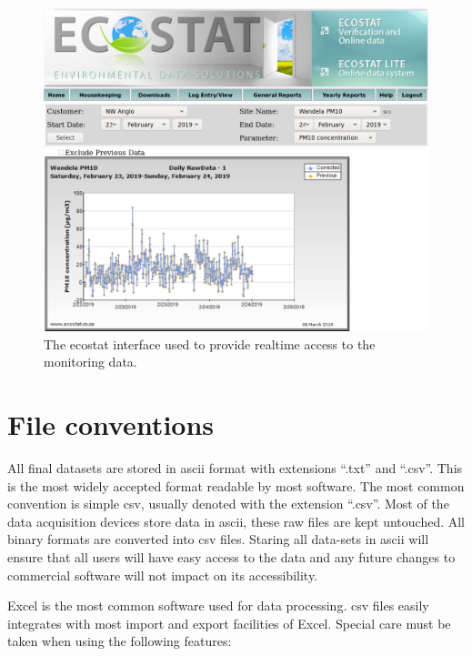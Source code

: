 \documentclass{nwureport}
\begin{document}
\begin{figure}[!htb]
    \centering
    \includegraphics[width=\textwidth]{images/ecostat_quick.png}
    \caption[Online interface to the realtime data.]{The ecostat interface used to provide realtime access to the monitoring data.}
    \label{fig:ecostat_quick}
\end{figure}

\section{File conventions}

All final datasets are stored in \gls{ascii} format with extensions
``.txt'' and ``.csv''. This is the most
widely accepted format readable by most software. The most common
convention is simple \gls{csv}, usually denoted with the extension
``.csv''. Most of the data acquisition devices
store data in \gls{ascii}, these raw files are kept untouched. All
binary formats are converted into \gls{csv} files. Staring all
data-sets in \gls{ascii} will ensure that all users will have easy
access to the data and any future changes to commercial software will
not impact on its accessibility.

Excel is the most common software used for data processing. \gls{csv}
files easily integrates with most import and export facilities of
Excel. Special care must be taken when using the following features:
\end{document}
